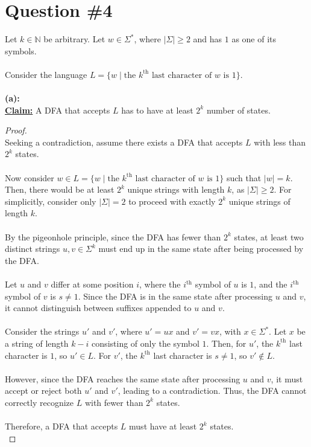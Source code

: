 \documentclass[12pt]{article}
\begin{document}
\section*{Question \#4}
Let $k \in \mathbb{N}$ be arbitrary. Let $w \in \Sigma^*$, where $|\Sigma| \geq 2$ and has $1$ as one of its symbols. \\
\\
Consider the language $L = \{ w \mid \text{the $k^\text{th}$ last character of $w$ is $1$} \}$. \\
\\
\textbf{(a):} \\
\textbf{\underline{Claim:}} A DFA that accepts $L$ has to have at least $2^k$ number of states.
\begin{proof}
\leavevmode\\
    Seeking a contradiction, assume there exists a DFA that accepts $L$ with less than $2^k$ states. \\
    \\
    Now consider $w \in L = \{ w \mid \text{the $k^\text{th}$ last character of $w$ is $1$} \}$ such that $|w| = k$. Then, there would be at least $2^k$ unique strings with length $k$, as $|\Sigma| \geq 2$. For simplicitly, consider only $|\Sigma| = 2$ to proceed with exactly $2^k$ unique strings of length $k$. \\
    \\
    By the pigeonhole principle, since the DFA has fewer than $2^k$ states, at least two distinct strings $u, v \in \Sigma^k$ must end up in the same state after being processed by the DFA. \\
    \\
    Let $u$ and $v$ differ at some position $i$, where the $i^\text{th}$ symbol of $u$ is $1$, and the $i^\text{th}$ symbol of $v$ is $s \neq 1$. Since the DFA is in the same state after processing $u$ and $v$, it cannot distinguish between suffixes appended to $u$ and $v$. \\
    \\
    Consider the strings $u'$ and $v'$, where $u' = ux$ and $v' = vx$, with $x \in \Sigma^*$. Let $x$ be a string of length $k - i$ consisting of only the symbol $1$. Then, for $u'$, the $k^\text{th}$ last character is $1$, so $u' \in L$. For $v'$, the $k^\text{th}$ last character is $s \neq 1$, so $v' \notin L$. \\
    \\
    However, since the DFA reaches the same state after processing $u$ and $v$, it must accept or reject both $u'$ and $v'$, leading to a contradiction. Thus, the DFA cannot correctly recognize $L$ with fewer than $2^k$ states. \\
    \\
    Therefore, a DFA that accepts $L$ must have at least $2^k$ states. \\
\end{proof}
\end{document}
